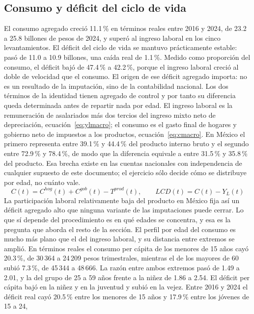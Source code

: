 \documentclass[11pt,a4paper]{article}
\begin{document}
\subsection{Consumo y déficit del ciclo de vida}
El consumo agregado creció 11.1\,\% en términos reales entre 2016 y 2024, de 23.2 a 25.8 billones
de pesos de 2024, y superó al ingreso laboral en los cinco levantamientos. El déficit del ciclo de
vida se mantuvo prácticamente estable: pasó de 11.0 a 10.9 billones, una caída real de 1.1\,\%.
Medido como proporción del consumo, el déficit bajó de 47.4\,\% a 42.2\,\%, porque el ingreso
laboral creció al doble de velocidad que el consumo.
El origen de ese déficit agregado importa: no es un resultado de la imputación, sino de la
contabilidad nacional. Los dos términos de la identidad tienen agregado de control y por tanto
su diferencia queda determinada antes de repartir nada por edad. El ingreso laboral es la
remuneración de asalariados más dos tercios del ingreso mixto neto de depreciación,
ecuación~\eqref{eq:ylmacro}; el consumo es el gasto final de hogares y gobierno neto de impuestos
a los productos, ecuación~\eqref{eq:cmacro}. En México el primero representa entre 39.1\,\% y
44.4\,\% del producto interno bruto y el segundo entre 72.9\,\% y 78.4\,\%, de modo que la
diferencia equivale a entre 31.5\,\% y 35.8\,\% del producto. Esa brecha existe en las cuentas
nacionales con independencia de cualquier supuesto de este documento; el ejercicio sólo decide
cómo se distribuye por edad, no cuánto vale.
\begin{equation}
\label{eq:cmacro}
C(t) = C^{hog}(t) + C^{gob}(t) - T^{prod}(t),
\qquad
LCD(t) = C(t) - Y_L(t)
\end{equation}
La participación laboral relativamente baja del producto en México fija así un déficit agregado
alto que ninguna variante de las imputaciones puede cerrar. Lo que sí depende del procedimiento
es en qué edades se concentra, y esa es la pregunta que aborda el resto de la sección.
El perfil por edad del consumo es mucho más plano que el del ingreso laboral, y su distancia entre
extremos se amplió. En términos reales el consumo per cápita de los menores de 15 años cayó
20.3\,\%, de 30\,364 a 24\,209 pesos trimestrales, mientras el de los mayores de 60 subió
7.3\,\%, de 45\,344 a 48\,666. La razón entre ambos extremos pasó de 1.49 a 2.01, y la del grupo
de 25 a 59 años frente a la niñez de 1.86 a 2.54.
El déficit per cápita bajó en la niñez y en la juventud y subió en la vejez. Entre 2016 y 2024 el
déficit real cayó 20.5\,\% entre los menores de 15 años y 17.9\,\% entre los jóvenes de 15 a 24,
\end{document}
